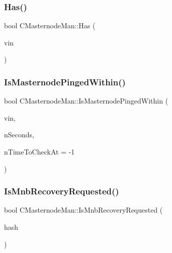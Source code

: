 \subsubsection{\texorpdfstring{Has()}{Has()}}
{\footnotesize\ttfamily bool C\+Masternode\+Man\+::\+Has (\begin{DoxyParamCaption}\item[{const C\+Tx\+In \&}]{vin }\end{DoxyParamCaption})}

\mbox{\label{class_c_masternode_man_af13ac323d324a06f704c1fde3c97e2e2}} 
\subsubsection{\texorpdfstring{Is\+Masternode\+Pinged\+Within()}{IsMasternodePingedWithin()}}
{\footnotesize\ttfamily bool C\+Masternode\+Man\+::\+Is\+Masternode\+Pinged\+Within (\begin{DoxyParamCaption}\item[{const C\+Tx\+In \&}]{vin,  }\item[{int}]{n\+Seconds,  }\item[{int64\+\_\+t}]{n\+Time\+To\+Check\+At = {\ttfamily -\/1} }\end{DoxyParamCaption})}

\mbox{\label{class_c_masternode_man_a52f953e116c5b4196b12831354fd0a4d}} 
\subsubsection{\texorpdfstring{Is\+Mnb\+Recovery\+Requested()}{IsMnbRecoveryRequested()}}
{\footnotesize\ttfamily bool C\+Masternode\+Man\+::\+Is\+Mnb\+Recovery\+Requested (\begin{DoxyParamCaption}\item[{const \mbox{\hyperlink{classuint256}{uint256}} \&}]{hash }\end{DoxyParamCaption})\hspace{0.3cm}{\ttfamily [inline]}}

